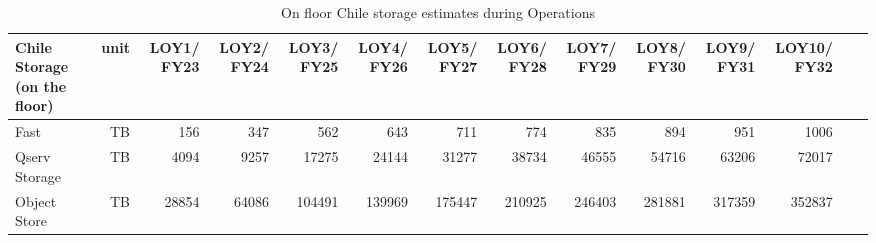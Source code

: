 \tiny \begin{longtable} { |p{}  |r  |r  |r  |r  |r  |r  |r  |r  |r  |r  |r  |r  |r |} 
\caption{On floor Chile storage estimates during Operations
 \label{tab:chileStorageOps}}\\ 
\hline 
\textbf{Chile Storage (on the floor)}&\textbf{unit}&\textbf{LOY1/ FY23}&\textbf{LOY2/ FY24}&\textbf{LOY3/ FY25}&\textbf{LOY4/ FY26}&\textbf{LOY5/ FY27}&\textbf{LOY6/ FY28}&\textbf{LOY7/ FY29}&\textbf{LOY8/ FY30}&\textbf{LOY9/ FY31}&\textbf{LOY10/ FY32}& \\ \hline
{Fast}&{TB}&{156}&{347}&{562}&{643}&{711}&{774}&{835}&{894}&{951}&{1006}& \\ \hline
{Qserv Storage}&{TB}&{4094}&{9257}&{17275}&{24144}&{31277}&{38734}&{46555}&{54716}&{63206}&{72017}& \\ \hline
{Object Store}&{TB}&{28854}&{64086}&{104491}&{139969}&{175447}&{210925}&{246403}&{281881}&{317359}&{352837}& \\ \hline
\end{longtable} \normalsize
